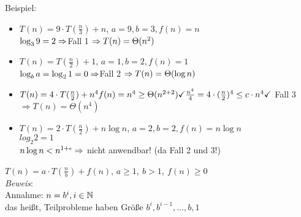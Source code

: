 Beispiel:
\begin{itemize}
\item
$T(n) = 9 \cdot T(\frac{n}{3}) +n$, $a=9, b=3, f(n) = n$ \\
$\log_3 9 = 2 \Ra $Fall 1 $\Ra T(n) = \Theta (n^2)$
\item
$T(n) = T(\frac{n}{2}) +1$, $a=1, b=2, f(n) = 1$ \\
$\log_b a= \log_2 1  = 0 \Ra $Fall 2 $\Ra T(n) = \Theta(\log n)$
\item $T(n) = 4 \cdot T(\frac{n}{2}) + n^4\\
f(n) = n^4 \geq \Theta(n^{2+2}) \checkmark\\
\frac{n^4}{4} = 4 \cdot (\frac{n}{2})^4 \leq c \cdot n^4 \checkmark$ Fall 3\\
$\Rightarrow T(n) = \Theta(n^4)$
\item
$T(n) = 2 \cdot T(\frac{n}{2}) + n \log n$, $a=2, b=2, f(n) = n \log n $ \\
$log_2 2 = 1$ \\
$n \log n < n^{1+\epsilon} \Ra $ nicht anwendbar! (da  Fall 2 und 3!)
\end{itemize}
$T(n) = a \cdot T(\frac{n}{b}) + f(n)$, $a\geq 1,\ b > 1,\ f(n) \geq 0$ \\
\emph{Beweis}:\\
Annahme: $n=b^i, i \in \mathbb{N}$ \\
das heißt, Teilprobleme haben Größe $b^i, b^{i-1}, \ldots, b, 1$ \\
